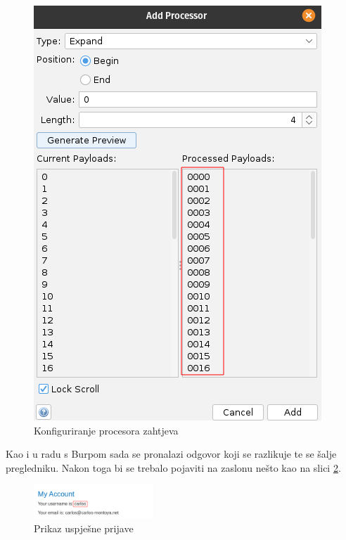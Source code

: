 \begin{figure}[H]
\begin{minipage}[b]{0.4\textwidth}
    \includegraphics[width=\textwidth]{slike/processor_fuzz.png}
    \caption{Konfiguriranje procesora zahtjeva}
    \label{slk:zap_config_proc}
  \end{minipage}
\end{figure}

Kao i u radu s Burpom sada se pronalazi odgovor koji se razlikuje te se šalje pregledniku. Nakon toga bi se trebalo pojaviti na zaslonu nešto kao na slici \ref{slk:zap_succ}.

\begin{figure}[H]
  \centering
  \includegraphics[width=0.4\textwidth]{slike/2fa_succ.png}
  \caption{Prikaz uspješne prijave}
  \label{slk:zap_succ}
\end{figure}
